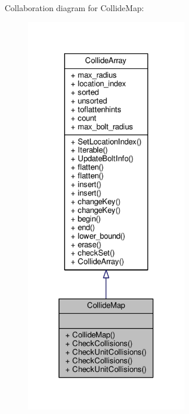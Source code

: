 Collaboration diagram for Collide\+Map\+:
\nopagebreak
\begin{figure}[H]
\begin{center}
\leavevmode
\includegraphics[width=201pt]{d3/d54/classCollideMap__coll__graph}
\end{center}
\end{figure}
